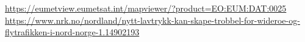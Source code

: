\begin{figure*}
{        %
        \href{https://eumetview.eumetsat.int/mapviewer/?product=EO:EUM:DAT:0025}{https://eumetview.eumetsat.int/mapviewer/?product=EO:EUM:DAT:0025}
        \href{https://www.nrk.no/nordland/nytt-lavtrykk-kan-skape-trobbel-for-wideroe-og-flytrafikken-i-nord-norge-1.14902193}{https://www.nrk.no/nordland/nytt-lavtrykk-kan-skape-trobbel-for-wideroe-og-flytrafikken-i-nord-norge-1.14902193}} 
        \label{fig:SEVIRI_channels}
    \end{figure*}